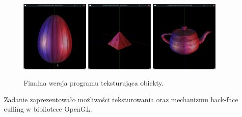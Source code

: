 \documentclass[a4paper]{article}
\begin{document}
\begin{figure}[H]
    \centering
    \includegraphics[width=0.3\textwidth]{egg}
    \includegraphics[width=0.3\textwidth]{pyramid}
    \includegraphics[width=0.3\textwidth]{teapot}

    \caption{Finalna wersja programu teksturująca obiekty.}
\end{figure}

Zadanie zaprezentowało możliwości teksturowania oraz mechanizmu back-face
culling w bibliotece OpenGL.
\end{document}
